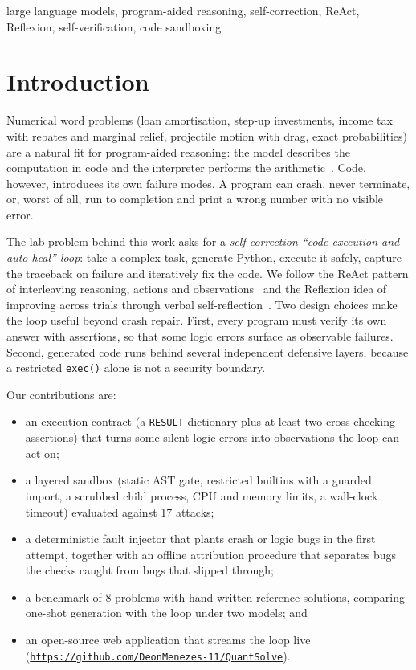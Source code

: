 \documentclass[conference]{IEEEtran}
\begin{document}
\begin{IEEEkeywords}
large language models, program-aided reasoning, self-correction, ReAct, Reflexion, self-verification, code sandboxing
\end{IEEEkeywords}

\section{Introduction}
Numerical word problems (loan amortisation, step-up investments, income tax with rebates and marginal relief, projectile motion with drag, exact probabilities) are a natural fit for program-aided reasoning: the model describes the computation in code and the interpreter performs the arithmetic~\cite{gao2023pal,chen2023pot}. Code, however, introduces its own failure modes. A program can crash, never terminate, or, worst of all, run to completion and print a wrong number with no visible error.

The lab problem behind this work asks for a \emph{self-correction ``code execution and auto-heal'' loop}: take a complex task, generate Python, execute it safely, capture the traceback on failure and iteratively fix the code. We follow the ReAct pattern of interleaving reasoning, actions and observations~\cite{yao2023react} and the Reflexion idea of improving across trials through verbal self-reflection~\cite{shinn2023reflexion}. Two design choices make the loop useful beyond crash repair. First, every program must verify its own answer with assertions, so that some logic errors surface as observable failures. Second, generated code runs behind several independent defensive layers, because a restricted \texttt{exec()} alone is not a security boundary.

Our contributions are:
\begin{itemize}
\item an execution contract (a \texttt{RESULT} dictionary plus at least two cross-checking assertions) that turns some silent logic errors into observations the loop can act on;
\item a layered sandbox (static AST gate, restricted builtins with a guarded import, a scrubbed child process, CPU and memory limits, a wall-clock timeout) evaluated against 17 attacks;
\item a deterministic fault injector that plants crash or logic bugs in the first attempt, together with an offline attribution procedure that separates bugs the checks caught from bugs that slipped through;
\item a benchmark of 8 problems with hand-written reference solutions, comparing one-shot generation with the loop under two models; and
\item an open-source web application that streams the loop live (\href{https://github.com/DeonMenezes-11/QuantSolve}{\nolinkurl{https://github.com/DeonMenezes-11/QuantSolve}}).
\end{itemize}
\end{document}
